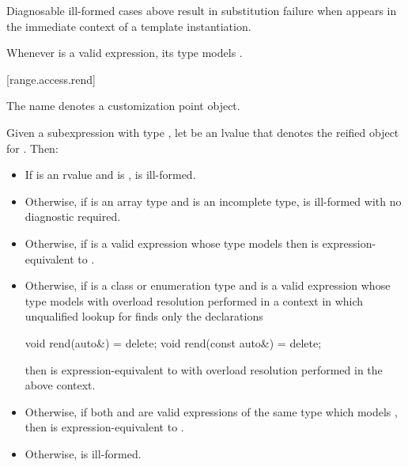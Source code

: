 \pnum
\begin{note}
Diagnosable ill-formed cases above result in substitution failure
when 
appears in the immediate context of a template instantiation.
\end{note}

\pnum
\begin{note}
Whenever  is a valid expression, its type models
.
\end{note}

[range.access.rend]{}
%

\pnum
The name  denotes a customization point
object.

\pnum
Given a subexpression  with type ,
let  be an lvalue that denotes the reified object for .
Then:

\begin{itemize}
\item
  If  is an rvalue and
   is ,
   is ill-formed.

\item
  Otherwise, if  is an array type and
   is an incomplete type,
   is ill-formed with no diagnostic required.

\item
  Otherwise, if 
  is a valid expression whose type models
  then  is expression-equivalent to
  .

\item
  Otherwise, if  is a class or enumeration type and
  is a valid expression whose type models
  with overload resolution performed in a context in which
  unqualified lookup for  finds only the declarations
\begin{codeblock}
void rend(auto&) = delete;
void rend(const auto&) = delete;
\end{codeblock}
  then  is expression-equivalent to
  with overload resolution performed in the above context.

\item
  Otherwise, if both  and 
  are valid expressions of the same type which models
  ,
  then  is expression-equivalent to
  .

\item
  Otherwise,  is ill-formed.
\end{itemize}

